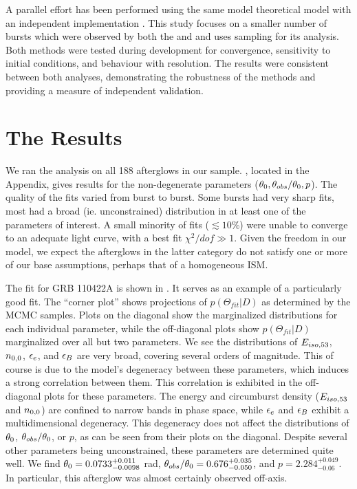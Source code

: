 A parallel effort has been performed using the same model theoretical model with an independent implementation \citep{Zhang14}.  This study focuses on a smaller number of bursts which were observed by both the \swiftXRT{} and \chandra{} and uses \multinest{} sampling for its analysis.  Both methods were tested during development for convergence, sensitivity to initial conditions, and behaviour with resolution.  The results were consistent between both analyses, demonstrating the robustness of the methods and providing a measure of independent validation.


\section{The Results}

We ran the \scalefit{} analysis on all 188 afterglows in our sample.  , located in the Appendix, gives results for the non-degenerate parameters ($\theta_0, \theta_{obs}/\theta_0, p$).  The quality of the fits varied from burst to burst.  Some bursts had very sharp fits, most had a broad (ie. unconstrained) distribution in at least one of the parameters of interest.  A small minority of fits ($\lesssim10\%$) were unable to converge to an adequate light curve, with a best fit $\chi^2/dof \gg 1$.  Given the freedom in our model, we expect the afterglows in the latter category do not satisfy one or more of our base assumptions, perhaps that of a homogeneous ISM.

The fit for GRB 110422A is shown in . It serves as an example of a particularly good fit.  The ``corner plot'' shows projections of $p(\Theta_{fit} | D)$ as determined by the MCMC samples.  Plots on the diagonal show the marginalized distributions for each individual parameter, while the off-diagonal plots show $p(\Theta_{fit} | D)$ marginalized over all but two parameters.  We see the distributions of $E_{iso, 53}$, $n_{0, 0}$, $\epsilon_e$, and $\epsilon_B$ are very broad, covering several orders of magnitude.  This of course is due to the model's degeneracy between these parameters, which induces a strong correlation between them. This correlation is exhibited in the off-diagonal plots for these parameters.  The energy and circumburst density ($E_{iso, 53}$ and $n_{0, 0}$) are confined to narrow bands in phase space, while $\epsilon_e$ and $\epsilon_B$ exhibit a multidimensional degeneracy.  This degeneracy does not affect the distributions of $\theta_0$, $\theta_{obs}/\theta_0$, or $p$, as can be seen from their plots on the diagonal.  Despite several other parameters being unconstrained, these parameters are determined quite well.  We find $\theta_0 = 0.0733^{+0.011}_{-0.0098}$ rad, $\theta_{obs}/\theta_0 = 0.676^{+0.035}_{-0.050}$, and $p=2.284^{+0.049}_{-0.06}$.  In particular, this afterglow was almost certainly observed off-axis.

